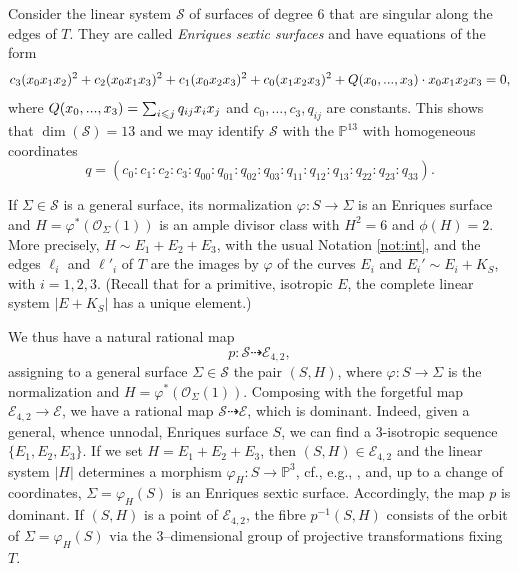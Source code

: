 \documentclass[11pt]{amsart}
\theoremstyle{definition}
\def\PP{{\mathbb P}}
\def\E{{\mathcal E}}
\begin{document}
Consider the linear system $\mathcal S$ of surfaces of degree 6  that  are singular along the edges of $T$. They are called \emph {Enriques sextic surfaces}  and  have equations of the form
\begin{equation} \label{eq:sigma}
c_3(x_0x_1x_2)^2+c_2(x_0x_1x_3)^2+c_1(x_0x_2x_3)^2+c_0(x_1x_2x_3)^2+Q\color{black}(x_0,...,x_3)\cdot\color{black}x_0x_1x_2x_3=0,
\end{equation} 
where $Q\color{black}(x_0,...,x_3)\color{black}=\sum_{i \leqslant j}q_{ij}x_ix_j$ \color{black} and $c_0,\ldots,c_3,q_{ij}$ are constants. \color{black} 
This shows that $\dim(\mathcal S)=13$ and we may identify $\mathcal S$ with the $\PP^ {13}$ with  homogeneous coordinates
\[ q=(c_0:c_1:c_2:c_3:q_{00}:q_{01}:q_{02}:q_{03}:q_{11}:q_{12}:q_{13}:q_{22}:q_{23}:q_{33}). \]

If $\Sigma\in \mathcal S$ is a general surface, its normalization $\varphi:S\to \Sigma$ is an Enriques surface and  $H=\varphi^* (\mathcal O_\Sigma (1))$  is an ample divisor class with $H^ 2=6$ and $\phi(H)=2$. More precisely,  $H \sim E_1+E_2+E_3$, with the usual Notation \ref{not:int},  and the edges $\ell_i$ and $\ell'_i$  of $T$ are the images  by $\varphi$  of the curves $E_i$ and  $E_i' \sim E_i+K_S$, with $i=1,2,3$. (Recall that for a primitive, isotropic $E$, the complete linear system $|E+K_S|$ has a unique  element.)  

We  thus have a natural rational map
\[ p: \mathcal S  \dasharrow \E_{4,2},\]
assigning to a general surface $\Sigma \in \mathcal S$ the pair $(S,H)$, where $\varphi:S\to \Sigma$ is the normalization and  $H=\varphi^* (\mathcal O_\Sigma (1))$.  Composing with the forgetful map $\E_{4,2}\to \E$, we have a rational map
$ \mathcal S  \dasharrow \E$,
which is dominant. Indeed, given  a general, whence unnodal,  Enriques surface $S$, we can find a 3-isotropic sequence $\{E_1,E_2,E_3\}$.  If we set $H=E_1+E_2+E_3$, then $(S,H)\in  \E_{4,2}$ and the linear system $|H|$ determines a morphism $\varphi_H: S\to \PP^ 3$, cf., e.g., \cite[Thm. 4.6.3 and 4.7.2]{cd}, 
and, up to a change of coordinates, $\Sigma=\varphi_H(S)$ is an Enriques sextic surface. Accordingly, the map $p$ is dominant. If $(S,H)$ is a point of  $\E_{4,2}$, the fibre $p^ {-1}(S,H)$ consists of the orbit of $\Sigma=\varphi_H(S)$ via the $3$--dimensional group of projective transformations  fixing   $T$.
\end{document}
